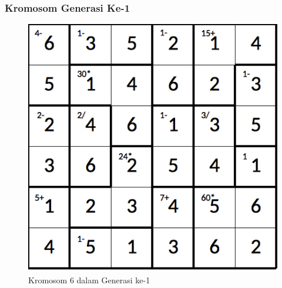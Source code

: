 \documentclass{beamer}
\begin{document}
\note{

}

\begin{frame}
\frametitle{Kromosom Generasi Ke-1}
\begin{figure}
\centering
\captionsetup{justification=centering}
\includegraphics[scale=0.333]{Gambar/hybridgenetic/Generation1Chromosome6}
\caption[Kromosom 6 dalam Generasi ke-1]{Kromosom 6 dalam Generasi ke-1}
\label{fig:analisisg1k6}
\end{figure}
\end{frame}

\note{

}
\end{document}
